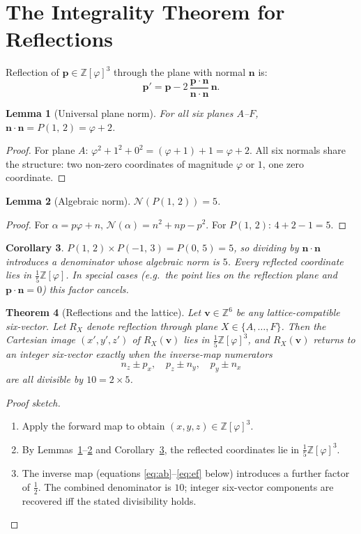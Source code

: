 \documentclass[12pt]{article}
\newtheorem{theorem}{Theorem}[section]
\newtheorem{lemma}[theorem]{Lemma}
\newtheorem{corollary}[theorem]{Corollary}
\theoremstyle{definition}
\theoremstyle{remark}
\newcommand{\Z}{\mathbb{Z}}
\newcommand{\Zphi}{\mathbb{Z}[\varphi]}
\newcommand{\Phib}[2]{P(#1,\,#2)}
\begin{document}
\section{The Integrality Theorem for Reflections}
\label{sec:reflect}
Reflection of $\mathbf{p}\in\Zphi^3$ through the plane with
normal $\mathbf{n}$ is:
\[
  \mathbf{p}' = \mathbf{p}
    - 2\,\frac{\mathbf{p}\cdot\mathbf{n}}{\mathbf{n}\cdot\mathbf{n}}\,\mathbf{n}.
\]
\begin{lemma}[Universal plane norm]
\label{lem:norm}
For all six planes $A$--$F$,\quad
$\mathbf{n}\cdot\mathbf{n} = \Phib{1}{2} = \varphi+2$.
\end{lemma}
\begin{proof}
For plane $A$: $\varphi^2+1^2+0^2=(\varphi+1)+1=\varphi+2$.
All six normals share the structure: two non-zero coordinates of
magnitude $\varphi$ or $1$, one zero coordinate.
\end{proof}
\begin{lemma}[Algebraic norm]
\label{lem:algnorm}
$\mathcal{N}(\Phib{1}{2})=5$.
\end{lemma}
\begin{proof}
For $\alpha=p\varphi+n$, $\mathcal{N}(\alpha)=n^2+np-p^2$.
For $\Phib{1}{2}$: $4+2-1=5$.
\end{proof}
\begin{corollary}
\label{cor:denom5}
$\Phib{1}{2}\times\Phib{-1}{3}=\Phib{0}{5}=5$, so dividing by
$\mathbf{n}\cdot\mathbf{n}$ introduces a denominator whose algebraic
norm is $5$.  Every reflected coordinate lies in $\tfrac{1}{5}\Zphi$.
In special cases (e.g.\ the point lies on the reflection plane and
$\mathbf{p}\cdot\mathbf{n}=0$) this factor cancels.
\end{corollary}
\begin{theorem}[Reflections and the lattice]
\label{thm:reflect}
Let $\mathbf{v}\in\Z^6$ be any lattice-compatible six-vector.
Let $R_X$ denote reflection through plane $X\in\{A,\ldots,F\}$.
Then the Cartesian image $(x',y',z')$ of $R_X(\mathbf{v})$ lies in
$\tfrac{1}{5}\Zphi^3$, and $R_X(\mathbf{v})$ returns to an integer
six-vector exactly when the inverse-map numerators
\[
  n_z\pm p_x,\quad p_z\pm n_y,\quad p_y\pm n_x
\]
are all divisible by $10=2\times 5$.
\end{theorem}
\begin{proof}[Proof sketch]
\begin{enumerate}[label=\arabic*.,leftmargin=*]
\item Apply the forward map to obtain $(x,y,z)\in\Zphi^3$.
\item By Lemmas~\ref{lem:norm}--\ref{lem:algnorm} and
  Corollary~\ref{cor:denom5}, the reflected coordinates lie in
  $\tfrac{1}{5}\Zphi^3$.
\item The inverse map (equations \eqref{eq:ab}--\eqref{eq:ef} below)
  introduces a further factor of $\tfrac{1}{2}$.  The combined
  denominator is $10$; integer six-vector components are recovered
  iff the stated divisibility holds.
\end{enumerate}
\end{proof}
\end{document}
